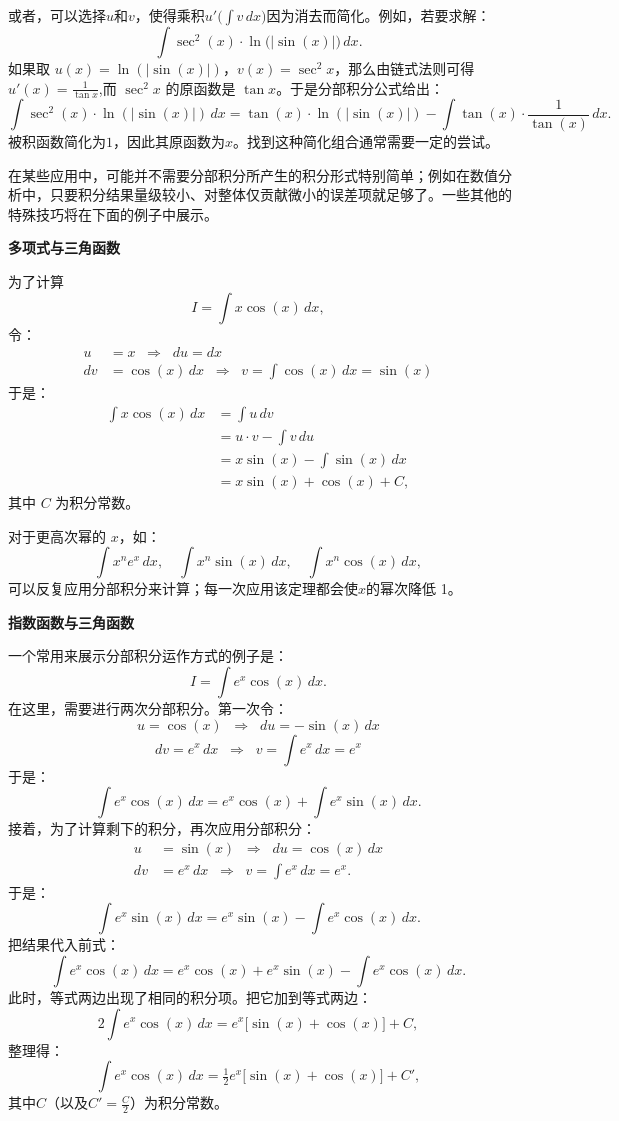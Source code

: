 或者，可以选择$u$和$v$，使得乘积$u' \bigl(\int v\,dx\bigr)$因为消去而简化。例如，若要求解：
$$
\int \sec^{2}(x)\cdot \ln\!\bigl(|\sin(x)|\bigr)\,dx.~
$$
如果取 $u(x) = \ln(|\sin(x)|)$，$v(x) = \sec^{2}x$，那么由链式法则可得$
u'(x) = \frac{1}{\tan x}$,而 $\sec^{2}x$ 的原函数是 $\tan x$。于是分部积分公式给出：
$$
\int \sec^{2}(x)\cdot \ln(|\sin(x)|)\,dx
= \tan(x)\cdot \ln(|\sin(x)|) - \int \tan(x)\cdot \frac{1}{\tan(x)}\,dx .~
$$
被积函数简化为$1$，因此其原函数为$x$。找到这种简化组合通常需要一定的尝试。

在某些应用中，可能并不需要分部积分所产生的积分形式特别简单；例如在数值分析中，只要积分结果量级较小、对整体仅贡献微小的误差项就足够了。一些其他的特殊技巧将在下面的例子中展示。

\textbf{多项式与三角函数}

为了计算
$$
I = \int x \cos(x)\,dx,~
$$
令：
$$
\begin{aligned}
u &= x \;\;\Rightarrow\;\; du = dx\\
dv &= \cos(x)\,dx \;\;\Rightarrow\;\; v = \int \cos(x)\,dx = \sin(x)
\end{aligned}~
$$
于是：
$$
\begin{aligned}
\int x\cos(x)\,dx &= \int u\,dv \\
&= u \cdot v - \int v\,du \\
&= x\sin(x) - \int \sin(x)\,dx \\
&= x\sin(x) + \cos(x) + C,
\end{aligned}~
$$
其中 $C$ 为积分常数。

对于更高次幂的 $x$，如：
$$
\int x^{n}e^{x}\,dx, \quad \int x^{n}\sin(x)\,dx, \quad \int x^{n}\cos(x)\,dx,~
$$
可以反复应用分部积分来计算；每一次应用该定理都会使$x$的幂次降低 1。

\textbf{指数函数与三角函数}

一个常用来展示分部积分运作方式的例子是：
$$
I = \int e^{x}\cos(x)\,dx.~
$$
在这里，需要进行两次分部积分。第一次令：
$$
u = \cos(x) \;\;\Rightarrow\;\; du = -\sin(x)\,dx~
$$
$$
dv = e^{x}\,dx \;\;\Rightarrow\;\; v = \int e^{x}\,dx = e^{x}~
$$
于是：
$$
\int e^{x}\cos(x)\,dx = e^{x}\cos(x) + \int e^{x}\sin(x)\,dx.~
$$
接着，为了计算剩下的积分，再次应用分部积分：
$$
\begin{aligned}
u &= \sin(x) \;\;\Rightarrow\;\; du = \cos(x)\,dx\\
dv &= e^{x}\,dx \;\;\Rightarrow\;\; v = \int e^{x}\,dx = e^{x}.
\end{aligned}~
$$
于是：
$$
\int e^{x}\sin(x)\,dx = e^{x}\sin(x) - \int e^{x}\cos(x)\,dx.~
$$
把结果代入前式：
$$
\int e^{x}\cos(x)\,dx = e^{x}\cos(x) + e^{x}\sin(x) - \int e^{x}\cos(x)\,dx.~
$$
此时，等式两边出现了相同的积分项。把它加到等式两边：
$$
2\int e^{x}\cos(x)\,dx = e^{x}\bigl[\sin(x) + \cos(x)\bigr] + C,~
$$
整理得：
$$
\int e^{x}\cos(x)\,dx = \tfrac{1}{2}e^{x}\bigl[\sin(x) + \cos(x)\bigr] + C',~
$$
其中$C$（以及$C' = \tfrac{C}{2}$）为积分常数。

